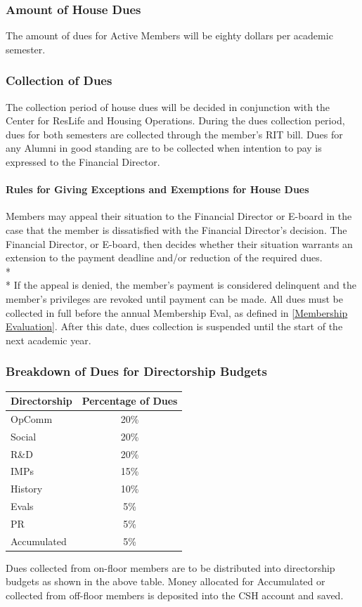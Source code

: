 \documentclass{article}
\newcommand{\asubsection}[1]{\subsubsection{#1} \label{#1}}
\newcommand{\asubsubsection}[1]{\paragraph{#1} \label{#1}}
\begin{document}
\asubsection{Amount of House Dues}
The amount of dues for Active Members will be eighty dollars per academic semester.

\asubsection{Collection of Dues}
The collection period of house dues will be decided in conjunction with the Center for ResLife and Housing Operations.
During the dues collection period, dues for both semesters are collected through the member’s RIT bill.
Dues for any Alumni in good standing are to be collected when intention to pay is expressed to the Financial Director.

\asubsubsection{Rules for Giving Exceptions and Exemptions for House Dues}
Members may appeal their situation to the Financial Director or E-board in the case that the member is dissatisfied with the Financial Director's decision.
The Financial Director, or E-board, then decides whether their situation warrants an extension to the payment deadline and/or reduction of the required dues.
\\*\\*
If the appeal is denied, the member’s payment is considered delinquent and the member’s privileges are revoked until payment can be made.
All dues must be collected in full before the annual Membership Eval, as defined in \ref{Membership Evaluation}.
After this date, dues collection is suspended until the start of the next academic year.
\asubsection{Breakdown of Dues for Directorship Budgets}
\begin{center}
	\begin{tabular}[c]{|l c|}
		\hline
		Directorship & Percentage of Dues
		\\ \hline
		\hline
		OpComm       & 20\%
		\\ \hline
		Social       & 20\%
		\\ \hline
		R\&D         & 20\%
		\\ \hline
		IMPs         & 15\%
		\\ \hline
		History      & 10\%
		\\ \hline
		Evals        & 5\%
		\\ \hline
		PR           & 5\%
		\\ \hline
		Accumulated  & 5\%
		\\ \hline
	\end{tabular}
\end{center}
Dues collected from on-floor members are to be distributed into directorship budgets as shown in the above table.
Money allocated for Accumulated or collected from off-floor members is deposited into the CSH account and saved.
\end{document}
